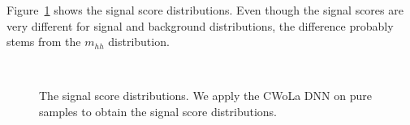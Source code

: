 \documentclass[12pt]{article}
\begin{document}
		Figure~\ref{fig:signal_score_distribution} shows the signal score distributions. Even though the signal scores are very different for signal and background distributions, the difference probably stems from the $m_{hh}$ distribution.
	 	\begin{figure}[htpb]
			\centering
			\\
			\caption{The signal score distributions. We apply the CWoLa DNN on pure samples to obtain the signal score distributions.}
			\label{fig:signal_score_distribution}
		\end{figure}
\end{document}
